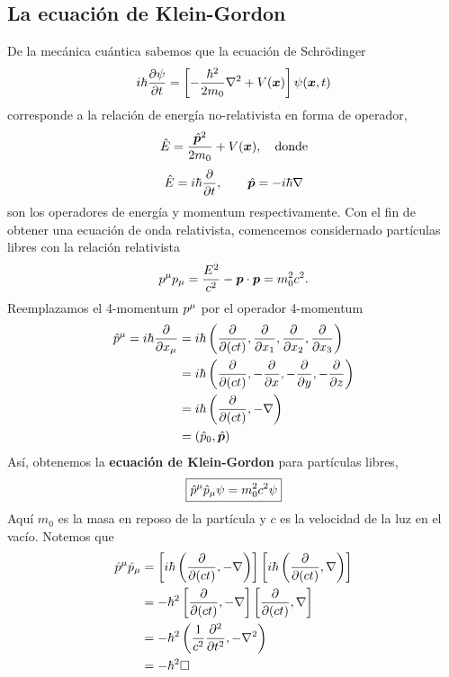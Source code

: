 \subsection{La ecuación de Klein-Gordon}
De la mecánica cuántica sabemos que la ecuación de Schrödinger
\begin{equation}
  i\hbar \pdv{\psi}{t}=\left[-\frac{\hbar^2}{2m_0}\nabla^2+V(\vec{x})\right]\psi\xt 
\end{equation}
corresponde a la relación de energía no-relativista en forma de operador,
\begin{equation}
  \hat{E}=\frac{\hat{\vec{p}}^2}{2m_0}+V(\vec{x}),\quad \rm donde
\end{equation}
\begin{equation}
  \hat{E}=i\hbar\pdv{t},\qquad \hat{\vec{p}}=-i\hbar\nabla
\end{equation}
son los operadores de energía y momentum respectivamente. Con el fin de obtener una ecuación de onda relativista, comencemos considernado partículas libres con la relación relativista
\begin{equation}
  p^\m p_\m =\frac{E^2}{c^2}-\vec{p}\cdot\vec{p}=m_0^2c^2.
\end{equation}
Reemplazamos el 4-momentum $p^\m $ por el operador 4-momentum
\begin{align}
  \hat{p}^\m =i\hbar\pdv{x_\m }&=i\hbar\left(\pdv{(ct)},\pdv{x_1},\pdv{x_2},\pdv{x_3}\right)\\
  &=i\hbar\left(\pdv{(ct)},-\pdv{x},-\pdv{y},-\pdv{z}\right)\\
  &=i\hbar\left(\pdv{(ct)},-\nabla\right)\\
  &=(\hat{p}_0,\hat{\vec{p}})
\end{align}
Así, obtenemos la \textbf{ecuación de Klein-Gordon} para partículas libres,
\begin{equation}\label{1.21}
  \boxed{\hat{p}^\m \hat{p}_\m \psi=m_0^2c^2\psi}
\end{equation}
Aquí $m_0$ es la masa en reposo de la partícula y $c$ es la velocidad de la luz en el vacío. Notemos que
\begin{align}
  \hat{p}^\m \hat{p}_\m&=\left[i\hbar\left(\pdv{(ct)},-\nabla\right)\right]\left[i\hbar\left(\pdv{(ct)},\nabla\right)\right]\\
  &=-\hbar^2\left[\pdv{(ct)},-\nabla\right]\left[\pdv{(ct)},\nabla\right]\\
  &=-\hbar^2\left(\frac{1}{c^2}\pdv[2]{t},-\nabla^2\right)\\
  &=-\hbar^2\Box
\end{align}

